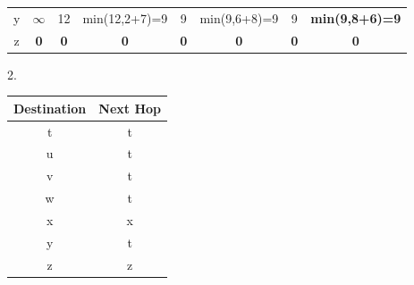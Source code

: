 \documentclass{report}
\begin{document}
\begin{problem}
\begin{table}[ht]
\begin{tabular}{cccccccc}
\multicolumn{1}{c|}{y} & $\infty$                          & 12                                & min(12,2+7)=9                           & 9                                            & min(9,6+8)=9                                    & 9                                            & {\color[HTML]{FD6864} \textbf{min(9,8+6)=9}} \\
\multicolumn{1}{c|}{z} & {\color[HTML]{FD6864} \textbf{0}} & \textbf{0}                        & \textbf{0}                              & \textbf{0}                                   & \textbf{0}                                      & \textbf{0}                                   & \textbf{0}                                     
\end{tabular}
\end{table}
\end{problem}

2.
\begin{table}[ht]
\begin{tabular}{cc}
\hline
Destination            & Next Hop \\ \hline
\multicolumn{1}{c|}{t} & t        \\
\multicolumn{1}{c|}{u} & t        \\
\multicolumn{1}{c|}{v} & t        \\
\multicolumn{1}{c|}{w} & t        \\
\multicolumn{1}{c|}{x} & x        \\
\multicolumn{1}{c|}{y} & t        \\
\multicolumn{1}{c|}{z} & z
\end{tabular}
\end{table}
\end{document}
